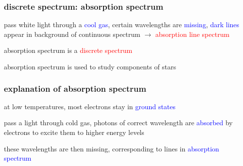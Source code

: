 \documentclass[12pt,xcolor=svgnames,handout]{beamer}
\newcommand{\keypoint}[1]{%
   \textcolor{red}{#1}%
}
\newcommand{\tightframetitle}[1]{ %
\frametitle{#1}\vspace{-.6\baselineskip}}
\begin{document}
\begin{frame}
\tightframetitle{discrete spectrum: absorption spectrum}

\begin{block}{}
pass white light through a \textcolor{blue}{cool gas}, certain wavelengths are \textcolor{blue}{missing}, \textcolor{blue}{dark lines} appear in background of continuous spectrum $\longrightarrow$ \keypoint{absorption line spectrum}
\end{block}

\begin{block}{}
absorption spectrum is a \keypoint{discrete spectrum}
\end{block}

\begin{block}{}
absorption spectrum is used to study components of stars
\end{block}

\begin{block}{}
\centering
{}
\end{block}

\end{frame}


\begin{frame}
\tightframetitle{explanation of absorption spectrum}

\begin{block}{}
at low temperatures, most electrons stay in \textcolor{blue}{ground states}
\end{block}

\pause

\begin{block}{}
pass a light through cold gas, photons of correct wavelength are \textcolor{blue}{absorbed} by electrons to excite them to higher energy levels
\end{block}

\pause

\begin{block}{}
these wavelengths are then missing, corresponding to lines in \textcolor{blue}{absorption spectrum}
\end{block}

\end{frame}
\end{document}
